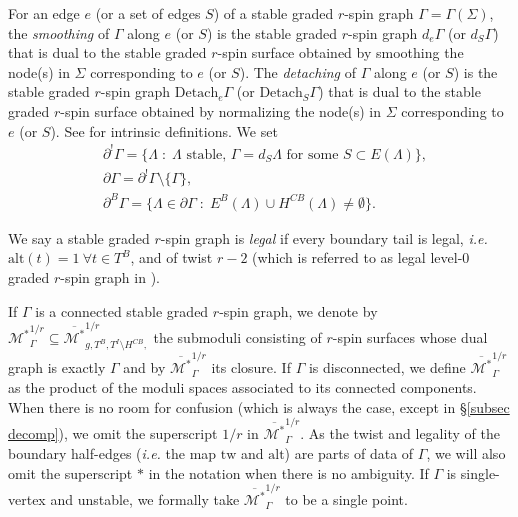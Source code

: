 \documentclass[11pt]{amsart}
\theoremstyle{definition}
\theoremstyle{remark}
\newcommand{\alt}{{\text{alt}}}
\newcommand{\tw}{\text{tw}}
\newcommand{\<}{\left<}
\renewcommand{\>}{\right>}
\numberwithin{equation}{section}
\def\Mbarstar{{\overline{\mathcal M^*}}}
\begin{document}
For an edge $e$ (or a set of edges $S$) of a stable graded $r$-spin graph $\Gamma=\Gamma(\Sigma)$,  the \textit{smoothing} of $\Gamma$ along $e$ (or $S$) is the stable graded $r$-spin graph $d_e\Gamma$ (or $d_S \Gamma$) that is dual to the stable graded $r$-spin surface obtained by smoothing the node(s) in $\Sigma$ corresponding to $e$ (or $S$). The \textit{detaching} of $\Gamma$ along $e$ (or $S$) is the stable graded $r$-spin graph $\text{Detach}_e\Gamma$ (or $\text{Detach}_S\Gamma$) that is dual to the stable graded $r$-spin surface obtained by normalizing the node(s) in $\Sigma$ corresponding to $e$ (or $S$). See \cite[\S 3.2]{TZ1} for intrinsic definitions. We set
\begin{align*}
&\partial^!\Gamma = \{\Lambda \; \colon \; \Lambda \text{ stable, }\Gamma= d_S\Lambda \text{ for some } S\subset E(\Lambda)\},\\
&\partial \Gamma = \partial^!\Gamma \setminus \{\Gamma\},\\
&\partial^B \Gamma = \{\Lambda \in \partial \Gamma \; \colon \; E^B(\Lambda) \cup H^{CB}(\Lambda) \neq \emptyset\}.
\end{align*}


We say a stable graded $r$-spin graph is \textit{legal} if every boundary tail is legal, \textit{i.e.} ${\text{alt}}(t)=1~\forall t \in T^B$, and of twist $r-2$ (which is referred to as legal level-$0$ graded $r$-spin graph in \cite{BCT2}). 

 If $\Gamma$ is a connected stable graded $r$-spin graph, we denote by %
${\mathcal M^*}_{\Gamma}^{1/r}\subseteq {\Mbarstar}_{g,  T^B, T^I\setminus H^{CB},}^{1/r}$ the  submoduli consisting of $r$-spin surfaces whose dual graph %
is %
exactly $\Gamma$ and %
by $\overline{{\mathcal M^*}}_{\Gamma}^{1/r}$ its closure. If $\Gamma$ is disconnected, we define $\Mbarstar_{\Gamma}^{1/r}$ as the product of the moduli spaces associated to its connected components. When there is no room for confusion (which is always the case, except in \S \ref{subsec decomp}), we omit the superscript $1/r$ in $\overline{{\mathcal M^*}}_{\Gamma}^{1/r}$. 
 As the twist %
and legality of the boundary half-edges (\textit{i.e.} the map $\tw$ and $\alt$) are parts of data %
of $\Gamma$, we will also omit the superscript $*$ in the notation when there is no ambiguity.
 If $\Gamma$ is single-vertex and unstable, we formally take $\Mbarstar^{1/r}_{\Gamma}$ to be a single point.
\end{document}
